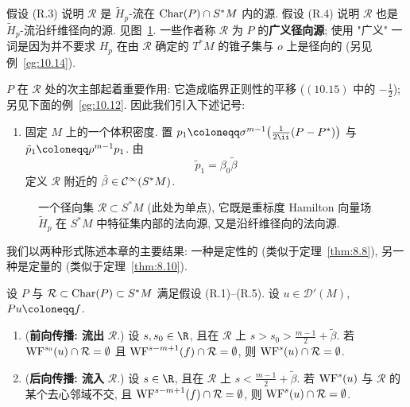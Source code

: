 假设 (R.3) 说明 $\mathcal{R}$ 是 $\tilde{H}_p$-流在 $\operatorname{Char}(P) \cap S^* M$ 内的源. 假设 (R.4) 说明 $\mathcal{R}$ 也是 $\tilde{H}_p$-流沿纤维径向的源. 见图~\ref{fig:10.2}. 一些作者称 $\mathcal{R}$ 为 $P$ 的\textbf{广义径向源}; 使用 "广义" 一词是因为并不要求 $H_p$ 在由 $\mathcal{R}$ 确定的 $T^* M$ 的锥子集与 $o$ 上是径向的 (另见例~\ref{eg:10.14}).

$P$ 在 $\mathcal{R}$ 处的次主部起着重要作用: 它造成临界正则性的平移 ($(10.15)$ 中的 $-\frac{1}{2}$); 另见下面的例~\ref{eg:10.12}. 因此我们引入下述记号:

\begin{enumerate}
    \item[(R.5)] 固定 $M$ 上的一个体积密度. 置 $p_1 \defeq \sigma^{m-1}\bigl(\frac{1}{2\ii}(P - P^*)\bigr)$ 与 $\tilde{p}_1 \defeq \rho^{m-1} p_1$. 由
    \begin{equation}\label{eq:10.21}
        \tilde{p}_1 = \beta_0 \tilde{\beta}
    \end{equation}
    定义 $\mathcal{R}$ 附近的 $\tilde{\beta} \in \mathcal{C}^\infty(S^* M)$.
\end{enumerate}

\begin{figure}[htbp]
\centering
\drawFigTenTwo
\caption{一个径向集 $\mathcal{R} \subset S^* M$ (此处为单点), 它既是重标度 Hamilton 向量场 $\tilde{H}_p$ 在 $S^* M$ 中特征集内部的法向源, 又是沿纤维径向的法向源.}
\label{fig:10.2}
\end{figure}

我们以两种形式陈述本章的主要结果: 一种是定性的 (类似于定理~\ref{thm:8.8}), 另一种是定量的 (类似于定理~\ref{thm:8.10}).

\begin{theorem}\label{thm:10.5}
设 $P$ 与 $\mathcal{R} \subset \operatorname{Char}(P) \subset S^* M$ 满足假设 (R.1)--(R.5). 设 $u \in \mathcal{D}'(M)$, $P u \defeq f$.
\begin{enumerate}
    \item (\textbf{前向传播: 流出} $\mathcal{R}$.) 设 $s, s_0 \in \R$, 且在 $\mathcal{R}$ 上 $s > s_0 > \frac{m-1}{2} + \tilde{\beta}$. 若 $\operatorname{WF}^{s_0}(u) \cap \mathcal{R} = \emptyset$ 且 $\operatorname{WF}^{s-m+1}(f) \cap \mathcal{R} = \emptyset$, 则 $\operatorname{WF}^s(u) \cap \mathcal{R} = \emptyset$.
    \item (\textbf{后向传播: 流入} $\mathcal{R}$.) 设 $s \in \R$, 且在 $\mathcal{R}$ 上 $s < \frac{m-1}{2} + \tilde{\beta}$. 若 $\operatorname{WF}^s(u)$ 与 $\mathcal{R}$ 的某个去心邻域不交, 且 $\operatorname{WF}^{s-m+1}(f) \cap \mathcal{R} = \emptyset$, 则 $\operatorname{WF}^s(u) \cap \mathcal{R} = \emptyset$.
\end{enumerate}
\end{theorem}

